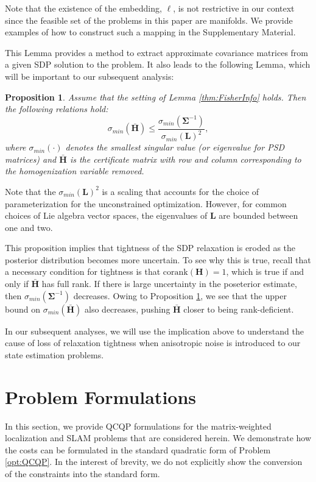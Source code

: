 \documentclass[lettersize,journal]{IEEEtran}
\newtheorem{proposition}[theorem]{Proposition}
\begin{document}
{Note that the existence of the embedding, $\bm{\ell}$, is not restrictive in our context since the feasible set of the problems in this paper are manifolds.  We provide examples of how to construct such a mapping in the Supplementary Material.

This Lemma provides a method to extract approximate covariance matrices from a given SDP solution to the problem. It also leads to the following Lemma, which will be important to our subsequent analysis:
\begin{proposition}\label{thm:eig_bounds}
	Assume that the setting of Lemma \ref{thm:FisherInfo} holds. Then the following relations hold:
	\begin{equation}
		\sigma_{min}(\bar{\bm{H}})  \leq \frac{\sigma_{min}(\bm{\Sigma}^{-1})}{\sigma_{min}(\bm{L})^2}, 
	\end{equation}
	where $\sigma_{min}(\cdot)$ denotes the smallest singular value (or eigenvalue for PSD matrices) and $\bar{\bm{H}}$ is the certificate matrix with row and column corresponding to the homogenization variable removed.
\end{proposition}

Note that the $\sigma_{min}(\bm{L})^2$ is a scaling that accounts for the choice of parameterization for the unconstrained optimization. However, for common choices of Lie algebra vector spaces, the eigenvalues of $\bm{L}$ are bounded between one and two.

This proposition implies that tightness of the SDP relaxation is eroded as the posterior distribution becomes more uncertain. To see why this is true, recall that a necessary condition for tightness is that $\mbox{corank}(\bm{H})=1$, which is true if and only if $\bar{\bm{H}}$ has full rank. If there is large uncertainty in the poseterior estimate, then $\sigma_{min}(\bm{\Sigma}^{-1})$ decreases. Owing to Proposition \ref{thm:eig_bounds}, we see that the upper bound on $\sigma_{min}(\bar{\bm{H}})$ also decreases, pushing $\bar{\bm{H}}$ closer to being rank-deficient. 

In our subsequent analyses, we will use the implication above to understand the cause of loss of relaxation tightness when anisotropic noise is introduced to our state estimation problems. 
}

\section{Problem Formulations}\label{sec:Formulations}

In this section, we provide QCQP formulations for the matrix-weighted localization and SLAM problems that are considered herein. We demonstrate how the costs can be formulated in the standard quadratic form of Problem \eqref{opt:QCQP}. In the interest of brevity, we do not explicitly show the conversion of the constraints into the standard form.
\end{document}
